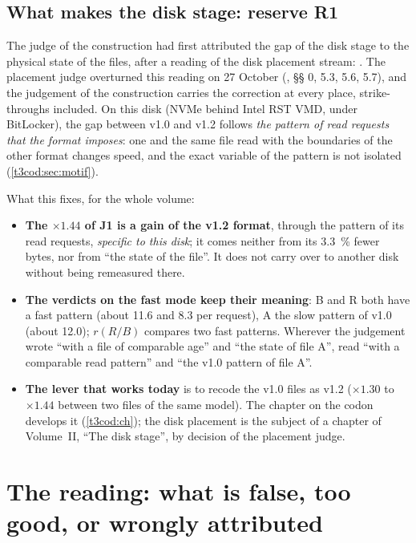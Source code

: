 \subsection{What makes the disk stage: reserve R1}\label{t3jug:sec:r1}

The judge of the construction had first attributed the gap of the disk stage to the physical state of the files, after a reading of the disk placement stream: . The placement judge overturned this reading on 27 October (, §§ 0, 5.3, 5.6, 5.7), and the judgement of the construction carries the correction at every place, strike-throughs included. On this disk (NVMe behind Intel RST VMD, under BitLocker), the gap between v1.0 and v1.2 follows \emph{the pattern of read requests that the format imposes}: one and the same file read with the boundaries of the other format changes speed, and the exact variable of the pattern is not isolated (\cref{t3cod:sec:motif}).

What this fixes, for the whole volume:
\begin{itemize}
\item \textbf{The $\times 1.44$ of J1 is a gain of the v1.2 format}, through the pattern of its read requests, \emph{specific to this disk}; it comes neither from its \SI{3.3}{\percent} fewer bytes, nor from ``the state of the file''. It does not carry over to another disk without being remeasured there.
\item \textbf{The verdicts on the fast mode keep their meaning}: B and R both have a fast pattern (about 11.6 and \SI{8.3}{\Mo} per request), A the slow pattern of v1.0 (about \SI{12.0}{\Mo}); $r(R/B)$ compares two fast patterns. Wherever the judgement wrote ``with a file of comparable age'' and ``the state of file A'', read ``with a comparable read pattern'' and ``the v1.0 pattern of file A''.
\item \textbf{The lever that works today} is to recode the v1.0 files as v1.2 ($\times 1.30$ to $\times 1.44$ between two files of the same model). The chapter on the codon develops it (\cref{t3cod:ch}); the disk placement is the subject of a chapter of Volume~II, ``The disk stage'', by decision of the placement judge.
\end{itemize}

\section{The reading: what is false, too good, or wrongly attributed}\label{t3jug:sec:lecture}

